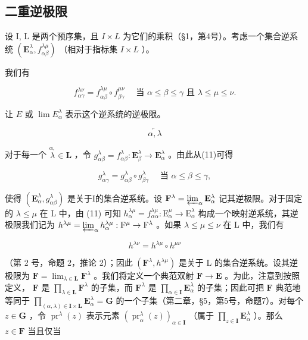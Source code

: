 \subsection{二重逆极限}

设 I, L 是两个预序集，且 \(I \times L\) 为它们的乘积（§1，第4号）。考虑一个集合逆系统 \((\mathbf{E}_{\alpha}^{\lambda}, f_{\alpha\beta}^{\lambda\mu})\) （相对于指标集 \(I \times L\) ）。

我们有

\[
f _ {\alpha \gamma} ^ {\lambda \nu} = f _ {\alpha \beta} ^ {\lambda \mu} \circ f _ {\beta \gamma} ^ {\mu \nu} \quad \text { 当 } \alpha \leqslant \beta \leqslant \gamma \text { 且 } \lambda \leqslant \mu \leqslant \nu . \tag {11}
\]

让 \(E\) 或 \(\lim E_{\alpha}^{\lambda}\) 表示这个逆系统的逆极限。

\[
\overleftarrow {\alpha , \lambda}
\]

对于每一个 \(\stackrel{\alpha,}{\lambda} \in \mathbf{L}\) ，令 \(g_{\alpha \beta}^{\lambda} = f_{\alpha \beta}^{\lambda}: \mathbf{E}_{\beta}^{\lambda} \to \mathbf{E}_{\alpha}^{\lambda}\) 。由此从(11)可得

\[
g _ {\alpha \gamma} ^ {\lambda} = g _ {\alpha \beta} ^ {\lambda} \circ g _ {\beta \gamma} ^ {\lambda} \quad \text { 当 } \alpha \leqslant \beta \leqslant \gamma ,\tag{12}
\]

使得 \((\mathbf{E}_{\alpha}^{\lambda}, g_{\alpha \beta}^{\lambda})\) 是关于I的集合逆系统。设 \(\mathbf{F}^{\lambda} = \varprojlim_{\alpha} \mathbf{E}_{\alpha}^{\lambda}\) 记其逆极限。对于固定的 \(\lambda \leqslant \mu\) 在 L 中，由 (11) 可知 \(h_{\alpha}^{\lambda \mu} = f_{\alpha \alpha}^{\lambda \mu}: \mathrm{E}_{\alpha}^{\mu} \to \mathrm{E}_{\alpha}^{\lambda}\) 构成一个映射逆系统，其逆极限我们记为 \(h^{\lambda \mu} = \varprojlim_{\alpha} h_{\alpha}^{\lambda \mu}: \mathrm{F}^{\mu} \to \mathrm{F}^{\lambda}\) 。如果 \(\lambda \leqslant \mu \leqslant \nu\) 在 L 中，我们有

\[
h ^ {\lambda \nu} = h ^ {\lambda \mu} \circ h ^ {\mu \nu}\tag{13}
\]

（第 2 号，命题 2，推论 2）；因此 \((\mathbf{F}^{\lambda}, h^{\lambda \mu})\) 是关于 L 的集合逆系统。设其逆极限为 \(\mathbf{F} = \lim_{\lambda \in \mathbf{L}} \mathbf{F}^{\lambda}\) 。我们将定义一个典范双射 \(\mathbf{F} \to \mathbf{E}\) 。为此，注意到按照定义， \(\mathbf{F}\) 是 \(\prod_{\lambda \in \mathbf{L}} \mathbf{F}^{\lambda}\) 的子集，而 \(\mathbf{F}^{\lambda}\) 是 \(\prod_{\alpha \in \mathbf{I}} \mathbf{E}_{\alpha}^{\lambda}\) 的子集；因此可把 \(\mathbf{F}\) 典范地等同于 \(\prod_{(\alpha, \lambda) \in \mathbf{I} \times \mathbf{L}} \mathbf{E}_{\alpha}^{\lambda} = \mathbf{G}\) 的一个子集（第二章，§5，第5号，命题7）。对每个 \(z \in \mathbf{G}\) ，令 \(\operatorname{pr}^{\lambda}(z)\) 表示元素 \((\operatorname{pr}_{\alpha}^{\lambda}(z))_{\alpha \in \mathbf{I}}\) （属于 \(\prod_{z \in \mathbf{I}} \mathbf{E}_{\alpha}^{\lambda}\) ）。那么 \(z \in \mathbf{F}\) 当且仅当


